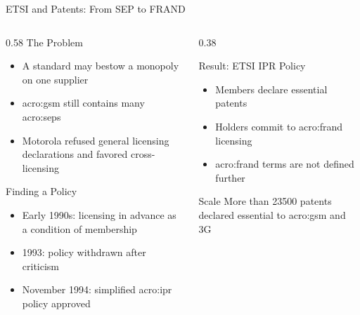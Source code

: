 \begin{frame}{ETSI and Patents: From SEP to FRAND}
  \begin{columns}[T,onlytextwidth]
    \begin{column}{0.58\textwidth}
      The Problem~\cite{bekkers-gsm}
      \begin{itemize}
        \item A standard may bestow a monopoly on one supplier
        \item \Gls{acro:gsm} still contains many \glspl{acro:sep}
        \item Motorola refused general licensing declarations and favored cross-licensing
      \end{itemize}
      \vspace{0.4em}
      Finding a Policy
      \begin{itemize}
        \item Early 1990s: licensing in advance as a condition of membership
        \item 1993: policy withdrawn after criticism
        \item November 1994: simplified \gls{acro:ipr} policy approved
      \end{itemize}
    \end{column}
    \begin{column}{0.38\textwidth}
      \begin{block}{Result: ETSI IPR Policy}
        \begin{itemize}
          \item Members declare essential patents
          \item Holders commit to \gls{acro:frand} licensing
          \item \Gls{acro:frand} terms are not defined further
        \end{itemize}
      \end{block}
      \begin{alertblock}{Scale}
        More than \num{23500} patents declared essential to \gls{acro:gsm} and 3G~\cite{sep-factsheet}
      \end{alertblock}
    \end{column}
  \end{columns}
\end{frame}

